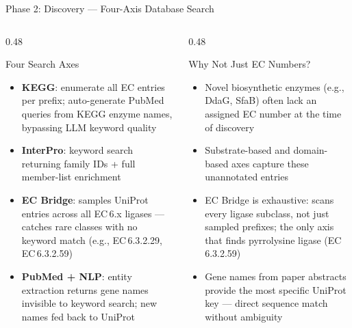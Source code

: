 \documentclass[aspectratio=169, 11pt]{beamer}
\begin{document}
\begin{frame}{Phase 2: Discovery --- Four-Axis Database Search}
\vspace{-2pt}
\begin{columns}[T]
\begin{column}{0.48\textwidth}
\begin{block}{\small Four Search Axes}
\vspace{-2pt}
\begin{itemize}\scriptsize
\setlength\itemsep{1pt}
\item \textbf{KEGG}: enumerate all EC entries per prefix; auto-generate PubMed queries from KEGG enzyme names, bypassing LLM keyword quality
\item \textbf{InterPro}: keyword search returning family IDs + full member-list enrichment
\item \textbf{EC Bridge}: samples UniProt entries across all EC\,6.x ligases --- catches rare classes with no keyword match (e.g., EC\,6.3.2.29, EC\,6.3.2.59)
\item \textbf{PubMed + NLP}: entity extraction returns gene names invisible to keyword search; new names fed back to UniProt
\end{itemize}
\end{block}
\end{column}
\begin{column}{0.48\textwidth}
\begin{exampleblock}{\small Why Not Just EC Numbers?}
\vspace{-2pt}
\begin{itemize}\scriptsize
\setlength\itemsep{1pt}
\item Novel biosynthetic enzymes (e.g., DdaG, SfaB) often lack an assigned EC number at the time of discovery
\item Substrate-based and domain-based axes capture these unannotated entries
\item EC Bridge is exhaustive: scans every ligase subclass, not just sampled prefixes; the only axis that finds pyrrolysine ligase (EC\,6.3.2.59)
\item Gene names from paper abstracts provide the most specific UniProt key --- direct sequence match without ambiguity
\end{itemize}
\end{exampleblock}
\end{column}
\end{columns}
\end{frame}
\end{document}
